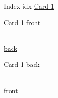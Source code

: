 \documentclass{article}
\newcommand{\helpline}{
  \noindent\makebox[\linewidth]{\rule{0.9\paperwidth}{0.4pt}}
}
\newcommand{\cardcontent}{
  \begin{center}
    \helpline
    \helpline
    \helpline
    \helpline
    \helpline
    \helpline
    \helpline
    \helpline
    \helpline
    \helpline
    \helpline
    \helpline
    \helpline
    \helpline
    \helpline
    \helpline
    \helpline
    \helpline
  \end{center}
}
\begin{document}
Index
\hypertarget{Index}{idx}
\hyperlink{card1:front}{Card 1}
\clearpage

\hypertarget{card1:front}{Card 1 front}\\
\hyperlink{card1:back}{back} \\ 
  \cardcontent
\clearpage

\hypertarget{card1:back}{Card 1 back}\\
\hyperlink{card1:front}{front}
\end{document}
